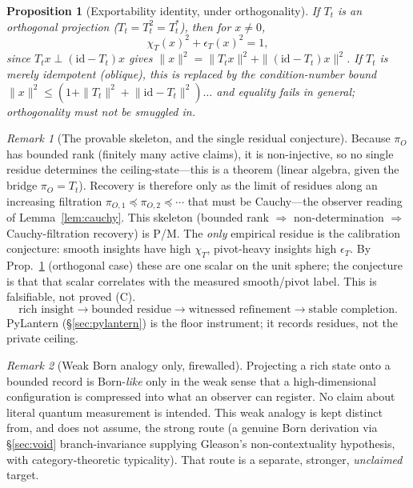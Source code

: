 \documentclass[11pt]{article}
\newtheorem{proposition}{Proposition}
\theoremstyle{definition}
\theoremstyle{remark}
\newtheorem*{remark}{Remark}
\begin{document}
\begin{proposition}[Exportability identity, under orthogonality]\label{prop:chi}
If $T_t$ is an orthogonal projection ($T_t=T_t^2=T_t^{*}$), then for $x\neq0$,
\[
  \chi_T(x)^2+\epsilon_T(x)^2=1,
\]
since $T_tx\perp(\mathrm{id}-T_t)x$ gives $\|x\|^2=\|T_tx\|^2+\|(\mathrm{id}-T_t)x\|^2$. If $T_t$ is
merely idempotent (oblique), this is replaced by the condition-number bound
$\|x\|^2\le(1+\|T_t\|^2\!+\!\|\mathrm{id}-T_t\|^2)\ldots$ and equality fails in general; orthogonality
must not be smuggled in.
\end{proposition}

\begin{remark}[The provable skeleton, and the single residual conjecture]
Because $\pi_O$ has bounded rank (finitely many active claims), it is non-injective, so no single
residue determines the ceiling-state---this is a theorem (linear algebra, given the bridge $\pi_O=T_t$).
Recovery is therefore only as the limit of residues along an increasing filtration
$\pi_{O,1}\preceq\pi_{O,2}\preceq\cdots$ that must be Cauchy---the observer reading of
Lemma~\ref{lem:cauchy}. This skeleton (bounded rank $\Rightarrow$ non-determination $\Rightarrow$
Cauchy-filtration recovery) is P/M. The \emph{only} empirical residue is the calibration conjecture:
smooth insights have high $\chi_T$, pivot-heavy insights high $\epsilon_T$. By
Prop.~\ref{prop:chi} (orthogonal case) these are one scalar on the unit sphere; the conjecture is that
that scalar correlates with the measured smooth/pivot label. This is falsifiable, not proved (C).
\[
  \text{rich insight} \to \text{bounded residue} \to \text{witnessed refinement} \to \text{stable completion}.
\]
PyLantern (\S\ref{sec:pylantern}) is the floor instrument; it records residues, not the private
ceiling.
\end{remark}

\begin{remark}[Weak Born analogy only, firewalled]
Projecting a rich state onto a bounded record is Born-\emph{like} only in the weak sense that a
high-dimensional configuration is compressed into what an observer can register. No claim about literal
quantum measurement is intended. This weak analogy is kept distinct from, and does not assume, the
strong route (a genuine Born derivation via \S\ref{sec:void} branch-invariance supplying Gleason's
non-contextuality hypothesis, with category-theoretic typicality). That route is a separate, stronger,
\emph{unclaimed} target.
\end{remark}
\end{document}
